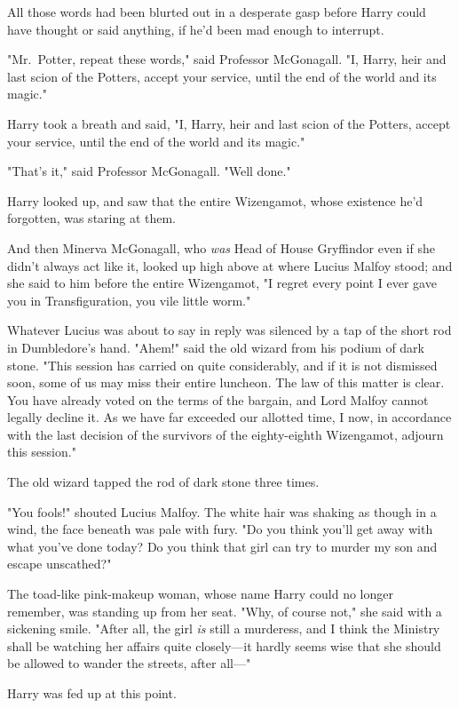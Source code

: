 All those words had been blurted out in a desperate gasp before Harry could 
have thought or said anything, if he'd been mad enough to interrupt.

"Mr.~Potter, repeat these words," said Professor McGonagall. "I, Harry, heir 
and last scion of the Potters, accept your service, until the end of the world 
and its magic."

Harry took a breath and said, "I, Harry, heir and last scion of the Potters, 
accept your service, until the end of the world and its magic."

"That's it," said Professor McGonagall. "Well done."

Harry looked up, and saw that the entire Wizengamot, whose existence he'd 
forgotten, was staring at them.

And then Minerva McGonagall, who \emph{was} Head of House Gryffindor even if 
she didn't always act like it, looked up high above at where Lucius Malfoy 
stood; and she said to him before the entire Wizengamot, "I regret every point 
I ever gave you in Transfiguration, you vile little worm."

Whatever Lucius was about to say in reply was silenced by a tap of the short 
rod in Dumbledore's hand. "Ahem!" said the old wizard from his podium of dark 
stone. "This session has carried on quite considerably, and if it is not 
dismissed soon, some of us may miss their entire luncheon. The law of this 
matter is clear. You have already voted on the terms of the bargain, and Lord 
Malfoy cannot legally decline it. As we have far exceeded our allotted time, I 
now, in accordance with the last decision of the survivors of the eighty-eighth 
Wizengamot, adjourn this session."

The old wizard tapped the rod of dark stone three times.

"You fools!" shouted Lucius Malfoy. The white hair was shaking as though in a 
wind, the face beneath was pale with fury. "Do you think you'll get away with 
what you've done today? Do you think that girl can try to murder my son and 
escape unscathed?"

The toad-like pink-makeup woman, whose name Harry could no longer remember, was 
standing up from her seat. "Why, of course not," she said with a sickening 
smile. "After all, the girl \emph{is} still a murderess, and I think the 
Ministry shall be watching her affairs quite closely---it hardly seems wise 
that she should be allowed to wander the streets, after all---"

Harry was fed up at this point.

